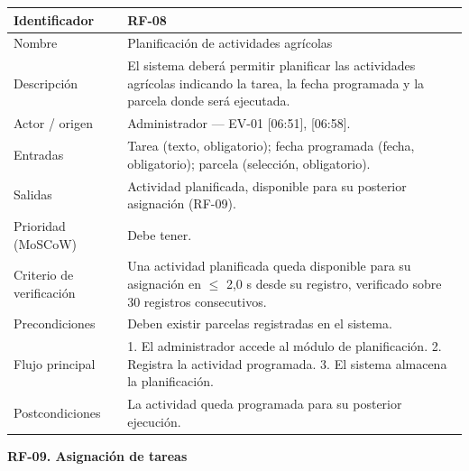 \documentclass[12pt,a4paper]{article}
\begin{document}
\begin{center}
\begin{longtable}{|p{3.5cm}|p{10.7cm}|}
\hline
Identificador & RF-08 \\
\hline
Nombre & Planificación de actividades agrícolas \\
\hline
Descripción & El sistema deberá permitir planificar las actividades agrícolas indicando la tarea, la fecha programada y la parcela donde será ejecutada. \\
\hline
Actor / origen & Administrador --- EV-01 [06:51], [06:58]. \\
\hline
Entradas & Tarea (texto, obligatorio); fecha programada (fecha, obligatorio); parcela (selección, obligatorio). \\
\hline
Salidas & Actividad planificada, disponible para su posterior asignación (RF-09). \\
\hline
Prioridad (MoSCoW) & Debe tener. \\
\hline
Criterio de verificación & Una actividad planificada queda disponible para su asignación en $\leq$ 2,0 s desde su registro, verificado sobre 30 registros consecutivos. \\
\hline
Precondiciones & Deben existir parcelas registradas en el sistema. \\
\hline
Flujo principal & 1. El administrador accede al módulo de planificación. 2. Registra la actividad programada. 3. El sistema almacena la planificación. \\
\hline
Postcondiciones & La actividad queda programada para su posterior ejecución. \\
\hline
\end{longtable}
\end{center}

\bigskip
\noindent\textbf{RF-09. Asignación de tareas}
\label{tab:RF-09}
\end{document}
